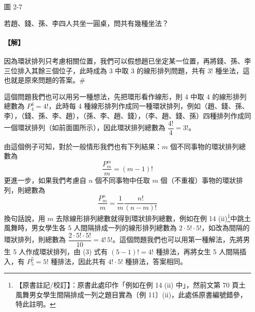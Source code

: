 \begin{center}

\vspace{0.3em}
圖 2-7
\end{center}

\begin{example}\label{ex:b5-2-12}
若趙、錢、孫、李四人共坐一圓桌，問共有幾種坐法？
\end{example}
\paragraph{【解】}
因為環狀排列只考慮相關位置，我們可以假想趙已坐定某一位置，再將錢、孫、李三位排入其餘三個位子，此時成為 3 中取 3 的線形排列問題，共有 $3!$ 種坐法，這也就是原來問題的答案。\hfill\#

這個問題我們也可以用另一種想法，先把環形看作線形，則 4 中取 4 的線形排列總數為 $P_4^4 = 4!$，此時每 4 種線形排列作成同一種環狀排列，例如（趙、錢、孫、李），（錢、孫、李、趙），（孫、李、趙、錢），（李、趙、錢、孫）四種排列作成同一個環狀排列（如前面圖所示），因此環狀排列總數為 $\dfrac{4!}{4} = 3!$。

由這個例子可知，對於一般情形我們也有下列結果：$m$ 個不同事物的環狀排列總數為
\begin{equation}
\frac{P_m^m}{m} = (m-1)!
\end{equation}
更進一步，如果我們考慮自 $n$ 個不同事物中任取 $m$ 個（不重複）事物的環狀排列，則總數為
\begin{equation}
\frac{P_m^n}{m} = \frac{1}{m} \frac{n!}{(n-m)!}
\end{equation}
換句話說，用 $m$ 去除線形排列總數就得到環狀排列總數，例如在例 14 (ii)\label{note:b5-ch2-p74-ex14}\footnote{【原書註記/校訂】：原書此處印作「例如在例 14 (ii) 中」，然前文第 70 頁土風舞男女學生間隔排成一列之題目實為〔例 11〕(ii)，此處係原書編號錯參，特此註明。}中跳土風舞時，男女學生各 5 人間隔排成一列的線形排列總數為 $2 \cdot 5! \cdot 5!$，如改為間隔的環狀排列，則總數為 $\dfrac{2 \cdot 5! \cdot 5!}{10} = 4! \, 5!$。這個問題我們也可以用第一種解法，先將男生 5 人作成環狀排列，由 (3) 式有 $(5-1)! = 4!$ 種排法，再將女生 5 人間隔插入，有 $P_5^5 = 5!$ 種排法，因此共有 $4! \cdot 5!$ 種排法，答案相同。

